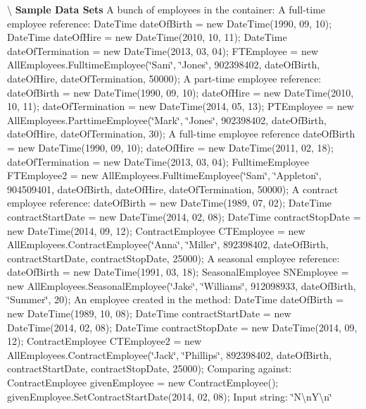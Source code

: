 \textbackslash{} {\bfseries  Sample Data Sets} A bunch of employees in the container\+: A full-\/time employee reference\+: Date\+Time date\+Of\+Birth = new Date\+Time(1990, 09, 10); Date\+Time date\+Of\+Hire = new Date\+Time(2010, 10, 11); Date\+Time date\+Of\+Termination = new Date\+Time(2013, 03, 04); F\+T\+Employee = new All\+Employees.\+Fulltime\+Employee(\char`\"{}\+Sam\char`\"{}, \char`\"{}\+Jones\char`\"{}, 902398402, date\+Of\+Birth, date\+Of\+Hire, date\+Of\+Termination, 50000); A part-\/time employee reference\+: date\+Of\+Birth = new Date\+Time(1990, 09, 10); date\+Of\+Hire = new Date\+Time(2010, 10, 11); date\+Of\+Termination = new Date\+Time(2014, 05, 13); P\+T\+Employee = new All\+Employees.\+Parttime\+Employee(\char`\"{}\+Mark\char`\"{}, \char`\"{}\+Jones\char`\"{}, 902398402, date\+Of\+Birth, date\+Of\+Hire, date\+Of\+Termination, 30); A full-\/time employee reference date\+Of\+Birth = new Date\+Time(1990, 09, 10); date\+Of\+Hire = new Date\+Time(2011, 02, 18); date\+Of\+Termination = new Date\+Time(2013, 03, 04); Fulltime\+Employee F\+T\+Employee2 = new All\+Employees.\+Fulltime\+Employee(\char`\"{}\+Sam\char`\"{}, \char`\"{}\+Appleton\char`\"{}, 904509401, date\+Of\+Birth, date\+Of\+Hire, date\+Of\+Termination, 50000); A contract employee reference\+: date\+Of\+Birth = new Date\+Time(1989, 07, 02); Date\+Time contract\+Start\+Date = new Date\+Time(2014, 02, 08); Date\+Time contract\+Stop\+Date = new Date\+Time(2014, 09, 12); Contract\+Employee C\+T\+Employee = new All\+Employees.\+Contract\+Employee(\char`\"{}\+Anna\char`\"{}, \char`\"{}\+Miller\char`\"{}, 892398402, date\+Of\+Birth, contract\+Start\+Date, contract\+Stop\+Date, 25000); A seasonal employee reference\+: date\+Of\+Birth = new Date\+Time(1991, 03, 18); Seasonal\+Employee S\+N\+Employee = new All\+Employees.\+Seasonal\+Employee(\char`\"{}\+Jake\char`\"{}, \char`\"{}\+Williams\char`\"{}, 912098933, date\+Of\+Birth, \char`\"{}\+Summer\char`\"{}, 20); An employee created in the method\+: Date\+Time date\+Of\+Birth = new Date\+Time(1989, 10, 08); Date\+Time contract\+Start\+Date = new Date\+Time(2014, 02, 08); Date\+Time contract\+Stop\+Date = new Date\+Time(2014, 09, 12); Contract\+Employee C\+T\+Employee2 = new All\+Employees.\+Contract\+Employee(\char`\"{}\+Jack\char`\"{}, \char`\"{}\+Phillips\char`\"{}, 892398402, date\+Of\+Birth, contract\+Start\+Date, contract\+Stop\+Date, 25000); Comparing against\+: Contract\+Employee given\+Employee = new Contract\+Employee(); given\+Employee.\+Set\+Contract\+Start\+Date(2014, 02, 08); Input string\+: \char`\"{}\+N\textbackslash{}n\+Y\textbackslash{}n\char`\"{}

